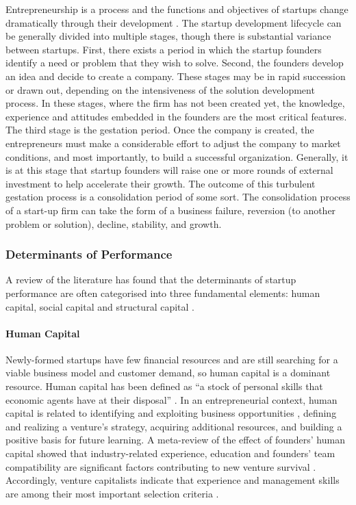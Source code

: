 \documentclass[../thesis/thesis.tex]{subfiles}
\begin{document}
Entrepreneurship is a process and the functions and objectives of startups change dramatically through their development \cite{mccullen2013, pena2002}. The startup development lifecycle can be generally divided into multiple stages, though there is substantial variance between startups. First, there exists a period in which the startup founders identify a need or problem that they wish to solve. Second, the founders develop an idea and decide to create a company. These stages may be in rapid succession or drawn out, depending on the intensiveness of the solution development process. In these stages, where the firm has not been created yet, the knowledge, experience and attitudes embedded in the founders are the most critical features. The third stage is the gestation period. Once the company is created, the entrepreneurs must make a considerable effort to adjust the company to market conditions, and most importantly, to build a successful organization. Generally, it is at this stage that startup founders will raise one or more rounds of external investment to help accelerate their growth. The outcome of this turbulent gestation process is a consolidation period of some sort. The consolidation process of a start-up firm can take the form of a business failure, reversion (to another problem or solution), decline, stability, and growth.

\subsubsection{Determinants of Performance}

A review of the literature has found that the determinants of startup performance are often categorised into three fundamental elements: human capital, social capital and structural capital \cite{baum2004,ahlers2015,pena2002}.

\paragraph{Human Capital}

Newly-formed startups have few financial resources and are still searching for a viable business model and customer demand, so human capital is a dominant resource. Human capital has been defined as ``a stock of personal skills that economic agents have at their disposal'' \cite{piazza2002}. In an entrepreneurial context, human capital is related to identifying and exploiting business opportunities \cite{shane2000}, defining and realizing a venture's strategy, acquiring additional resources, and building a positive basis for future learning. A meta-review of the effect of founders' human capital showed that industry-related experience, education and founders' team compatibility are significant factors contributing to new venture survival \cite{gimmon2010}. Accordingly, venture capitalists indicate that experience and management skills are among their most important selection criteria \cite{zacharakis2000}.
\end{document}
